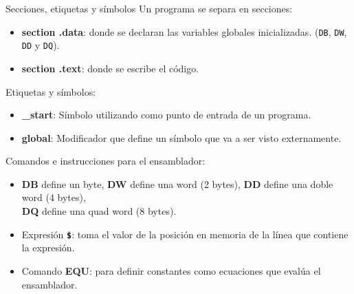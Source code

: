 \documentclass[aspectratio=169]{beamer}
\begin{document}
\begin{frame}[fragile]{Secciones, etiquetas y símbolos}
    Un programa se separa en secciones:\\
    \begin{itemize}
    \item \normalsize \textbf{section .data}: donde se declaran las variables globales inicializadas. \small (\texttt{DB}, \texttt{DW}, \texttt{DD} y \texttt{DQ}).
    \item \normalsize \textbf{section .text}: donde se escribe el código.
    \end{itemize}
    \pause
    Etiquetas y símbolos:\\
    \begin{itemize}
        \item \textbf{\_start}: Símbolo utilizando como punto de entrada de un programa.
        \item \textbf{global}: Modificador que define un símbolo que va a ser visto externamente.
    \end{itemize}
    \pause
    Comandos e instrucciones para el ensamblador:\\
    \begin{itemize}
    \item \textbf{DB} define un byte, \textbf{DW} define una word (2 bytes), \textbf{DD} define una doble word (4 bytes),\\ \textbf{DQ} define una quad word (8 bytes). %
    \item Expresión \textbf{\texttt{\$}}: toma el valor de la posición en memoria de la línea que contiene la expresión.
    \item Comando \textbf{EQU}: para definir constantes como ecuaciones que evalúa el ensamblador.
    \end{itemize}
\end{frame}
\end{document}
